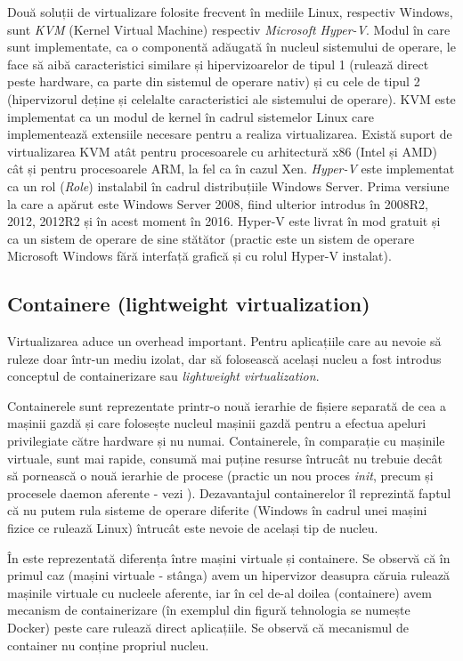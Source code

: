 Două soluții de virtualizare folosite frecvent în mediile Linux, respectiv Windows, sunt \textit{KVM}  (Kernel Virtual Machine) respectiv \textit{Microsoft Hyper-V}.
Modul în care sunt implementate, ca o componentă adăugată în nucleul sistemului de operare, le face să aibă caracteristici similare și hipervizoarelor de tipul 1 (rulează direct peste hardware, ca parte din sistemul de operare nativ) și cu cele de tipul 2 (hipervizorul deține și celelalte caracteristici ale sistemului de operare).
KVM este implementat ca un modul de kernel în cadrul sistemelor Linux care implementează extensiile necesare pentru a realiza virtualizarea.
Există suport de virtualizarea KVM atât pentru procesoarele cu arhitectură x86 (Intel și AMD) cât și pentru procesoarele ARM, la fel ca în cazul Xen.
\textit{Hyper-V} este implementat ca un rol (\textit{Role}) instalabil în cadrul distribuțiile Windows Server.
Prima versiune la care a apărut este Windows Server 2008, fiind ulterior introdus în 2008R2, 2012, 2012R2 și în acest moment în 2016.
Hyper-V este livrat în mod gratuit și ca un sistem de operare de sine stătător (practic este un sistem de operare Microsoft Windows fără interfață grafică și cu rolul Hyper-V instalat).

\subsection{Containere (lightweight virtualization)}
\label{sec:vm:concepts:containers}

Virtualizarea aduce un overhead important. Pentru aplicațiile care au nevoie să
ruleze doar într-un mediu izolat, dar să folosească același nucleu a
fost introdus conceptul de containerizare sau \textit{lightweight
virtualization}.

Containerele sunt reprezentate printr-o nouă ierarhie de
fișiere separată de cea a mașinii gazdă și care folosește nucleul
mașinii gazdă pentru a efectua apeluri privilegiate către hardware și nu numai.
Containerele, în comparație cu mașinile virtuale, sunt mai rapide, consumă mai
puține resurse întrucât nu trebuie decât să pornească o nouă ierarhie de procese
(practic un nou proces \textit{init}, precum și procesele daemon aferente - vezi
). Dezavantajul containerelor îl
reprezintă faptul că nu putem rula sisteme de operare diferite (Windows în
cadrul unei mașini fizice ce rulează Linux) întrucât este nevoie de același tip
de nucleu.

În  este reprezentată
diferența între mașini virtuale și containere. Se observă că în primul caz
(mașini virtuale - stânga) avem un hipervizor deasupra căruia rulează mașinile
virtuale cu nucleele aferente, iar în cel de-al doilea (containere) avem
mecanism de containerizare (în exemplul din figură tehnologia se numește Docker)
peste care rulează direct aplicațiile. Se observă că mecanismul de container nu
conține propriul nucleu.

